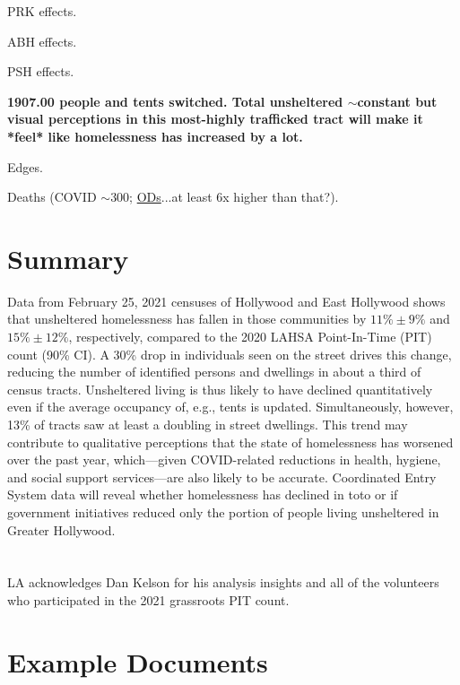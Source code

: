 \documentclass[11pt,twocolumn]{article}
\def\bfr{\bf\color{red}}
\def\Count{count}
\def\resp{respectively}
\begin{document}
PRK effects.

ABH effects.

PSH effects.

{\bfr 1907.00 people and tents switched. Total unsheltered $\sim$constant but visual perceptions
in this most-highly trafficked tract will make it *feel* like homelessness has increased by a lot.}


Edges.

Deaths (COVID $\sim$300; \href{http://publichealth.lacounty.gov/phcommon/public/media/mediapubhpdetail.cfm?prid=2900#:~:text=LOS\%20ANGELES\%20\%E2\%80\%93The\%20Los\%20Angeles,deaths\%20among\%20people\%20experiencing\%20homelessness.}{ODs}...at least 6x higher
than that?).

\section{Summary}
\label{sec:summary}

Data from February 25, 2021 censuses of Hollywood and East Hollywood shows that 
unsheltered homelessness has fallen in those communities by $11\%\pm9\%$ and 
$15\%\pm12\%$, \resp, compared to the 2020 LAHSA Point-In-Time (PIT) count (90\% CI). 
A 30\% drop in individuals seen on the street drives this change, reducing the number of identified 
persons and dwellings in about a third of census tracts. Unsheltered living is thus likely to have 
declined quantitatively even if the average occupancy of, e.g., tents is updated. Simultaneously, 
however, 13\% of tracts saw at least a doubling in street dwellings. This trend may contribute to 
qualitative perceptions that the state of homelessness has worsened over the past year, which---given 
COVID-related reductions in health, hygiene, and social support services---are also likely to be accurate.
Coordinated Entry System data will reveal whether homelessness has declined in toto or if 
government initiatives reduced only the portion of people living unsheltered in Greater Hollywood.

\section*{}

LA acknowledges Dan Kelson for his analysis insights and all of the volunteers who participated
in the 2021 grassroots PIT \Count.

\appendix

\section{Example Documents}
\end{document}
